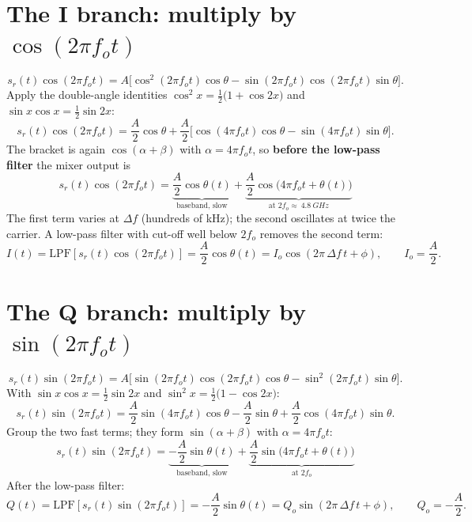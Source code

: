 \documentclass[11pt,a4paper]{article}
\begin{document}
\section{The I branch: multiply by $\cos(2\pi f_o t)$}
\[
  s_r(t)\cos(2\pi f_o t)
  = A\Big[\cos^2(2\pi f_o t)\cos\theta - \sin(2\pi f_o t)\cos(2\pi f_o t)\sin\theta\Big].
\]
Apply the double-angle identities $\cos^2 x = \tfrac{1}{2}\big(1+\cos 2x\big)$ and $\sin x\cos x = \tfrac{1}{2}\sin 2x$:
\[
  s_r(t)\cos(2\pi f_o t)
  = \frac{A}{2}\cos\theta
  + \frac{A}{2}\Big[\cos(4\pi f_o t)\cos\theta - \sin(4\pi f_o t)\sin\theta\Big].
\]
The bracket is again $\cos(\alpha+\beta)$ with $\alpha = 4\pi f_o t$, so \textbf{before the low-pass filter} the mixer output is
\begin{equation}
  s_r(t)\cos(2\pi f_o t)
  = \underbrace{\frac{A}{2}\cos\theta(t)}_{\text{baseband, slow}}
  + \underbrace{\frac{A}{2}\cos\!\big(4\pi f_o t + \theta(t)\big)}_{\text{at }2f_o\approx\ \SI{4.8}{GHz}}
  \label{eq:Imix}
\end{equation}
The first term varies at $\Delta f$ (hundreds of kHz); the second oscillates at twice the carrier. A low-pass filter with cut-off well below $2f_o$ removes the second term:
\[
  I(t) = \mathrm{LPF}\!\left[s_r(t)\cos(2\pi f_o t)\right]
       = \frac{A}{2}\cos\theta(t)
       = I_o\cos\!\left(2\pi\,\Delta f\,t + \phi\right),
  \qquad I_o = \frac{A}{2}.
\]

\section{The Q branch: multiply by $\sin(2\pi f_o t)$}
\[
  s_r(t)\sin(2\pi f_o t)
  = A\Big[\sin(2\pi f_o t)\cos(2\pi f_o t)\cos\theta - \sin^2(2\pi f_o t)\sin\theta\Big].
\]
With $\sin x\cos x = \tfrac{1}{2}\sin 2x$ and $\sin^2 x = \tfrac{1}{2}\big(1-\cos 2x\big)$:
\[
  s_r(t)\sin(2\pi f_o t)
  = \frac{A}{2}\sin(4\pi f_o t)\cos\theta
    - \frac{A}{2}\sin\theta
    + \frac{A}{2}\cos(4\pi f_o t)\sin\theta .
\]
Group the two fast terms; they form $\sin(\alpha+\beta)$ with $\alpha = 4\pi f_o t$:
\begin{equation}
  s_r(t)\sin(2\pi f_o t)
  = \underbrace{-\frac{A}{2}\sin\theta(t)}_{\text{baseband, slow}}
  + \underbrace{\frac{A}{2}\sin\!\big(4\pi f_o t + \theta(t)\big)}_{\text{at }2f_o}
  \label{eq:Qmix}
\end{equation}
After the low-pass filter:
\[
  Q(t) = \mathrm{LPF}\!\left[s_r(t)\sin(2\pi f_o t)\right]
       = -\frac{A}{2}\sin\theta(t)
       = Q_o\sin\!\left(2\pi\,\Delta f\,t + \phi\right),
  \qquad Q_o = -\frac{A}{2}.
\]
\end{document}
